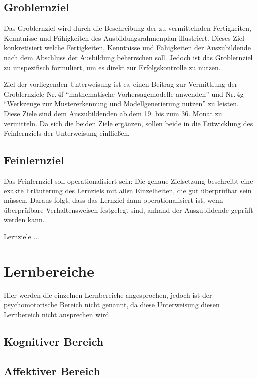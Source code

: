 \subsection{Groblernziel}
Das Groblernziel wird durch die Beschreibung der zu vermittelnden Fertigkeiten, Kenntnisse und Fähigkeiten des Ausbildungsrahmenplan illustriert. Dieses Ziel konkretisiert welche Fertigkeiten, Kenntnisse und Fähigkeiten der Auszubildende nach dem Abschluss der Ausbildung beherrschen soll. Jedoch ist das Groblernziel zu unspezifisch formuliert, um es direkt zur Erfolgskontrolle zu nutzen. 
\par
Ziel der vorliegenden Unterweisung ist es, einen Beitrag zur Vermittlung der Groblernziele Nr.\,4f \enquote{mathematische Vorhersagemodelle anwenden} und Nr.\,4g \enquote{Werkzeuge zur Mustererkennung und Modellgenerierung nutzen} zu leisten. Diese Ziele sind dem Auszubildenden ab dem 19. bis zum 36. Monat zu vermitteln. Da sich die beiden Ziele ergänzen, sollen beide in die Entwicklung des Feinlernziels der Unterweisung einfließen. 
 
\subsection{Feinlernziel}
Das Feinlernziel soll operationalisiert sein: Die genaue Zielsetzung beschreibt eine exakte Erläuterung des Lernziels mit allen Einzelheiten, die gut überprüfbar sein müssen. Daraus folgt, dass das Lernziel dann operationalisiert ist, wenn überprüfbare Verhaltensweisen festgelegt sind, anhand der Auszubildende geprüft werden kann. 
\par
Lernziele ...

\section{Lernbereiche}
Hier werden die einzelnen Lernbereiche angesprochen, jedoch ist der psychomotorische Bereich nicht genannt, da diese Unterweisung diesen Lernbereich nicht ansprechen wird.

\subsection{Kognitiver Bereich}

\subsection{Affektiver Bereich}

